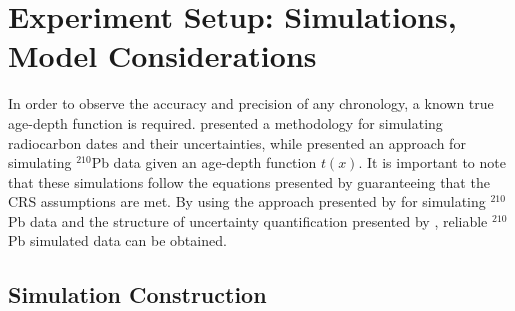 \documentclass [10pt] {article}
\begin{document}
\section{Experiment Setup: Simulations, Model Considerations}

	In order to observe the accuracy and precision of any chronology, a known true age-depth function is required.
\citet{Blaauw2018} presented a methodology for simulating radiocarbon dates and their uncertainties, while \citet{Aquino2018} presented an approach for simulating $^{210}$Pb data given an age-depth function $t(x)$.
It is important to note that these simulations follow the equations presented by \cite{Appleby1978, Robbins1978} guaranteeing that the CRS assumptions are met. 
By using the approach presented by \citet{Aquino2018} for simulating $^{210}$Pb data and the structure of uncertainty quantification presented by \citet{Blaauw2018}, reliable $^{210}$Pb simulated data can be obtained.

\subsection{Simulation Construction}\label{sec:SimConst}
\end{document}
